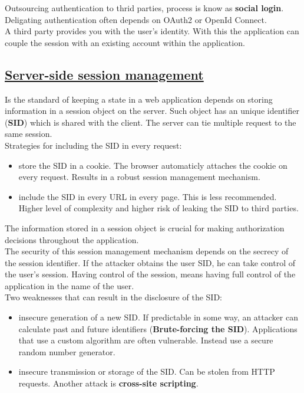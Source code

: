 \documentclass[titlepage]{article}
\begin{document}
    Outsourcing authentication to thrid parties, process is know as \textbf{social login}. Deligating authentication often depends on OAuth2 or OpenId Connect.\\
    A third party provides you with the user's identity. With this the application can couple the session with an existing account within the application.
    \subsection{\href{https://youtu.be/-BRndrFZiqI}{Server-side session management}}
    Is the standard of keeping a state in a web application depends on storing information in a session object on the server. Such object has an unique identifier (\textbf{SID}) which is shared with the client. The server can tie multiple request to the same session.\\
    Strategies for including the SID in every request:
    \begin{itemize}
        \item store the SID in a cookie. The browser automaticly attaches the cookie on every request. Results in a robust session management mechanism.
        \item include the SID in every URL in every page. This is less recommended. Higher level of complexity and higher risk of leaking the SID to third parties.
    \end{itemize}
    The information stored in a session object is crucial for making authorization decisions throughout the application.\\
    The security of this session management mechanism depends on the secrecy of the session identifier. If the attacker obtains the user SID, he can take control of the user's session. Having control of the session, means having full control of the application in the name of the user.\\
    Two weaknesses that can result in the disclosure of the SID:
    \begin{itemize}
        \item insecure generation of a new SID. If predictable in some way, an attacker can calculate past and future identifiers (\textbf{Brute-forcing the SID}). Applications that use a custom algorithm are often vulnerable. Instead use a secure random number generator.
        \item insecure transmission or storage of the SID. Can be stolen from HTTP requests. Another attack is \textbf{cross-site scripting}. 
    \end{itemize}
\end{document}
